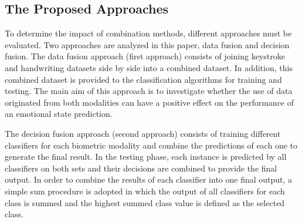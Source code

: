 \documentclass[conference]{IEEEtran}
\begin{document}



\subsection{The Proposed Approaches}

To determine the impact of combination methods, different approaches must be evaluated. Two approaches are analyzed in this paper, data fusion and decision fusion. 
The data fusion approach (first approach) consists of joining keystroke and handwriting datasets side by side into a combined dataset. In addition, this combined dataset is provided to the classification algorithms for training and testing. The main aim of this approach is to investigate whether the use of data originated from both modalities can have a positive effect on the performance of an emotional state prediction. 

The decision fusion approach (second approach) consists of training different classifiers for each biometric modality and combine the predictions of each one to generate the final result. In the testing phase, each instance is predicted by all classifiers on both sets and their decisions are combined to provide the final output. 
In order to combine the results of each classifier into one final output, a simple sum procedure is adopted in which the output of all classifiers for each class is summed and the highest summed class value is defined as the selected class.
\end{document}
